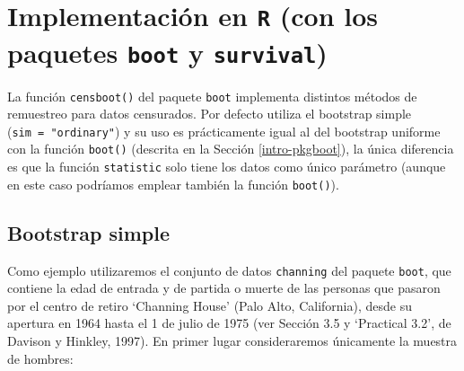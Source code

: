 \documentclass[
]{book}
\newenvironment{Shaded}{\begin{snugshade}}{\end{snugshade}}
\newcommand{\CommentTok}[1]{\textcolor[rgb]{0.56,0.35,0.01}{\textit{#1}}}
\newcommand{\DataTypeTok}[1]{\textcolor[rgb]{0.13,0.29,0.53}{#1}}
\newcommand{\DecValTok}[1]{\textcolor[rgb]{0.00,0.00,0.81}{#1}}
\newcommand{\KeywordTok}[1]{\textcolor[rgb]{0.13,0.29,0.53}{\textbf{#1}}}
\newcommand{\NormalTok}[1]{#1}
\newcommand{\OperatorTok}[1]{\textcolor[rgb]{0.81,0.36,0.00}{\textbf{#1}}}
\newcommand{\StringTok}[1]{\textcolor[rgb]{0.31,0.60,0.02}{#1}}
\theoremstyle{break}
\theoremstyle{definition}
\theoremstyle{definition}
\theoremstyle{definition}
\theoremstyle{remark}
\begin{document}
\hypertarget{implementaciuxf3n-en-r-con-los-paquetes-boot-y-survival}{%
\section{\texorpdfstring{Implementación en \texttt{R} (con los paquetes \texttt{boot} y \texttt{survival})}{Implementación en R (con los paquetes boot y survival)}}\label{implementaciuxf3n-en-r-con-los-paquetes-boot-y-survival}}

La función \texttt{censboot()} del paquete \texttt{boot} implementa distintos métodos
de remuestreo para datos censurados. Por defecto utiliza el bootstrap simple
(\texttt{sim\ =\ "ordinary"}) y su uso es prácticamente igual al del bootstrap uniforme
con la función \texttt{boot()} (descrita en la Sección \ref{intro-pkgboot}),
la única diferencia es que la función \texttt{statistic} solo tiene los datos
como único parámetro (aunque en este caso podríamos emplear también
la función \texttt{boot()}).

\hypertarget{bootstrap-simple}{%
\subsection{Bootstrap simple}\label{bootstrap-simple}}

Como ejemplo utilizaremos el conjunto de datos \texttt{channing} del paquete \texttt{boot},
que contiene la edad de entrada y de partida o muerte de las personas
que pasaron por el centro de retiro `Channing House' (Palo Alto, California),
desde su apertura en 1964 hasta el 1 de julio de 1975
(ver Sección 3.5 y `Practical 3.2', de Davison y Hinkley, 1997).
En primer lugar consideraremos únicamente la muestra de hombres:

\begin{Shaded}
\end{Shaded}
\end{document}

